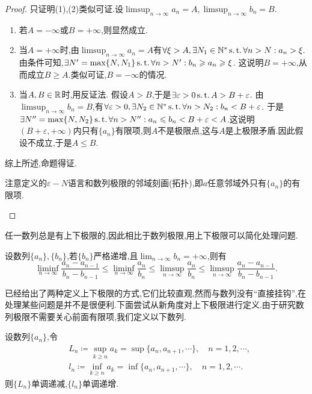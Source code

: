 \begin{proof}
    只证明(1),(2)类似可证.设$\limsup_{n\to\infty}a_n=A,\limsup_{n\to\infty}b_n=B.$
    \begin{enumerate}
        \item 若$A=-\infty$或$B=+\infty$,则显然成立.
        \item 当$A=+\infty$时,由$\limsup_{n\to\infty}a_n=A$有$\forall \xi >A,\exists N_1\in\mathbb{N}^*\operatorname{s.t.}\forall n>N:a_n>\xi.$由条件可知,$\exists N'=\max\{N,N_1\}\operatorname{s.t.}\forall n>N':b_n\geqslant a_n\geqslant\xi$.
        这说明$B=+\infty$,从而成立$B\geqslant A$.类似可证,$B=-\infty$的情况.
        \item 当$A,B\in\mathbb{R}$时,用反证法.
        假设$A>B$,于是$\exists \varepsilon >0\operatorname{s.t.} A>B+\varepsilon$.
        由$\limsup_{n\to\infty}b_n=B$,有$\forall \varepsilon >0,\exists N_2\in\mathbb{N}^*\operatorname{s.t.}\forall n>N_2:b_n<B+\varepsilon$.
        于是$\exists N''=\max\{N,N_2\}\operatorname{s.t.}\forall n>N'': a_n\leqslant b_n<B+\varepsilon<A$.这说明$(B+\varepsilon,+\infty)$内只有$\{a_n\}$有限项,则$A$不是极限点,这与$A$是上极限矛盾.因此假设不成立,于是$A\leqslant B.$
    \end{enumerate}
    综上所述,命题得证.
\begin{note}
    注意定义的$\varepsilon-N$语言和数列极限的邻域刻画(拓扑),即$a$任意邻域外只有$\{a_n\}$的有限项.
\end{note}
\end{proof}

任一数列总是有上下极限的,因此相比于数列极限,用上下极限可以简化处理问题.

\begin{example}%
    设数列$\{a_n\},\{b_n\}$,若$\{b_n\}$严格递增,且$\lim_{n\to\infty}b_n=+\infty$,则有
    \[\liminf_{n\to\infty}\frac{a_n-a_{n-1}}{b_n-b_{n-1}}\leqslant\liminf_{n\to\infty}\frac{a_n}{b_n}\leqslant\limsup_{n\to\infty}\frac{a_n}{b_n}\leqslant\limsup_{n\to\infty}\frac{a_n-a_{n-1}}{b_n-b_{n-1}}.\]
\end{example}

已经给出了两种定义上下极限的方式,它们比较直观,然而与数列没有“直接挂钩”,在处理某些问题是并不是很便利.下面尝试从新角度对上下极限进行定义.由于研究数列极限不需要关心前面有限项,我们定义以下数列.

\begin{definition}
    设数列$\{a_n\}$,令
    \begin{align*}
        &L_n\coloneq\sup_{k\geqslant n}a_k=\sup\{a_n,a_{n+1},\cdots\},\quad n=1,2,\cdots,\\
        &l_n\coloneq\inf_{k\geqslant n}a_k=\inf\{a_n,a_{n+1},\cdots\},\quad n=1,2,\cdots.
    \end{align*}
    则$\{L_n\}$单调递减,$\{l_n\}$单调递增.
\end{definition}

